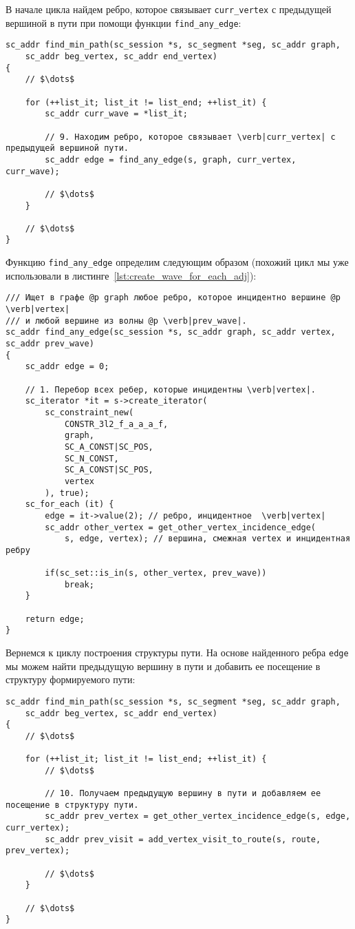 В начале цикла найдем ребро, которое связывает \lstinline|curr_vertex|
с предыдущей вершиной в пути при помощи функции
\lstinline|find_any_edge|:

\begin{lstlisting}[texcl]
sc_addr find_min_path(sc_session *s, sc_segment *seg, sc_addr graph,
    sc_addr beg_vertex, sc_addr end_vertex)
{
    // $\dots$

    for (++list_it; list_it != list_end; ++list_it) {
        sc_addr curr_wave = *list_it;

        // 9. Находим ребро, которое связывает \verb|curr_vertex| с предыдущей вершиной пути.
        sc_addr edge = find_any_edge(s, graph, curr_vertex, curr_wave);

        // $\dots$
    }

    // $\dots$
}
\end{lstlisting}

Функцию \lstinline|find_any_edge| определим следующим образом (похожий
цикл мы уже использовали в
листинге~\ref{lst:create_wave_for_each_adj}):

\begin{lstlisting}[texcl]
/// Ищет в графе @p graph любое ребро, которое инцидентно вершине @p \verb|vertex|
/// и любой вершине из волны @p \verb|prev_wave|.
sc_addr find_any_edge(sc_session *s, sc_addr graph, sc_addr vertex, sc_addr prev_wave)
{
    sc_addr edge = 0;

    // 1. Перебор всех ребер, которые инцидентны \verb|vertex|.
    sc_iterator *it = s->create_iterator(
        sc_constraint_new(
            CONSTR_3l2_f_a_a_a_f,
            graph,
            SC_A_CONST|SC_POS,
            SC_N_CONST,
            SC_A_CONST|SC_POS,
            vertex
        ), true);
    sc_for_each (it) {
        edge = it->value(2); // ребро, инцидентное  \verb|vertex|
        sc_addr other_vertex = get_other_vertex_incidence_edge(
            s, edge, vertex); // вершина, смежная vertex и инцидентная ребру

        if(sc_set::is_in(s, other_vertex, prev_wave))
            break;
    }

    return edge;
}
\end{lstlisting}

Вернемся к циклу построения структуры пути. На основе найденного ребра
\lstinline|edge| мы можем найти предыдущую вершину в пути и добавить
ее посещение в структуру формируемого пути:

\begin{lstlisting}[texcl]
sc_addr find_min_path(sc_session *s, sc_segment *seg, sc_addr graph,
    sc_addr beg_vertex, sc_addr end_vertex)
{
    // $\dots$

    for (++list_it; list_it != list_end; ++list_it) {
        // $\dots$

        // 10. Получаем предыдущую вершину в пути и добавляем ее посещение в структуру пути.
        sc_addr prev_vertex = get_other_vertex_incidence_edge(s, edge, curr_vertex);
        sc_addr prev_visit = add_vertex_visit_to_route(s, route, prev_vertex);

        // $\dots$
    }

    // $\dots$
}
\end{lstlisting}

